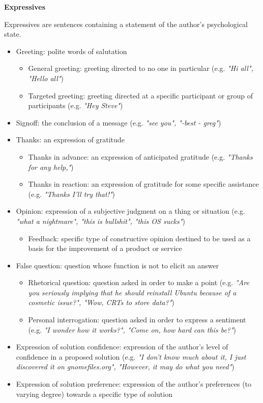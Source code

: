 \documentclass[11pt]{article}
\begin{document}
\textbf{Expressives}
\vspace{0.1cm}

Expressives are sentences containing a statement of the author's psychological state.

\begin{itemize}
	\item Greeting: polite words of salutation
		\begin{itemize}
			\item General greeting: greeting directed to no one in particular (e.g. \textit{"Hi all", "Hello all"})
			\item Targeted greeting: greeting directed at a specific participant or group of participants (e.g. \textit{"Hey Steve"})
		\end{itemize}
	\item Signoff: the conclusion of a message (e.g. \textit{"see you", "-best - greg"})
	\item Thanks: an expression of gratitude
		\begin{itemize}
			\item Thanks in advance: an expression of anticipated gratitude (e.g. \textit{"Thanks for any help,"})
			\item Thanks in reaction: an expression of gratitude for some specific assistance (e.g. \textit{"Thanks I'll try that!"})
		\end{itemize}
	\item Opinion: expression of a subjective judgment on a thing or situation (e.g. \textit{"what a nightmare", "this is bullshit", "this OS sucks"})
		\begin{itemize}
			\item Feedback: specific type of constructive opinion destined to be used as a basis for the improvement of a product or service
		\end{itemize}
	\item False question: question whose function is not to elicit an answer
		\begin{itemize}
			\item Rhetorical question: question asked in order to make a point (e.g. \textit{"Are you seriously implying that he should reinstall Ubuntu because of a cosmetic issue?", "Wow, CRTs to store data?"})
			\item Personal interrogation: question asked in order to express a sentiment (e.g. \textit{"I wonder how it works?", "Come on, how hard can this be?"})
		\end{itemize}
	\item Expression of solution confidence: expression of the author's level of confidence in a proposed solution (e.g. \textit{"I don't know much about it, I just discovered it on gnomefiles.org", "However, it may do what you need"})
	\item Expression of solution preference: expression of the author's preferences (to varying degree) towards a specific type of solution
\end{itemize}
\end{document}
